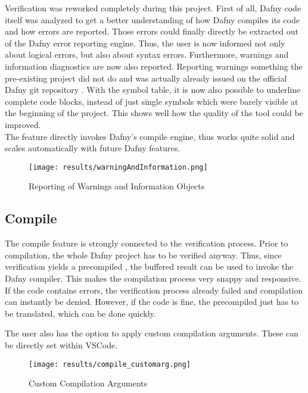 Verification was reworked completely during this project.
First of all, Dafny code itself was analyzed to get a better understanding of how Dafny compiles its code and how errors are reported.
Those errors could finally directly be extracted out of the Dafny error reporting engine.
Thus, the user is now informed not only about logical errors, but also about syntax errors.
Furthermore, warnings and information diagnostics are now also reported.
Reporting warnings something the pre-existing project did not do and was actually already issued on the official Dafny git repository \cite{dafny_noWarnings}.
With the symbol table, it is now also possible to underline complete code blocks, instead of just single symbols which were barely visible at the beginning of the project.
This shows well how the quality of the tool could be improved.\\

The feature directly invokes Dafny's compile engine, thus works quite solid and scales automatically with future Dafny features.

\begin{figure}[H]
    \centering
    \texttt{[image: results/warningAndInformation.png]}
    \caption{Reporting of Warnings and Information Objects}
    \label{fig:result_warnd_info}
\end{figure}

\subsection{Compile}
The compile feature is strongly connected to the verification process.
Prior to compilation, the whole Dafny project has to be verified anyway.
Thus, since verification yields a precompiled , the buffered result can be used to invoke the Dafny compiler.
This makes the compilation process very snappy and responsive.\\

If the code contains errors, the verification process already failed and compilation can instantly be denied.
However, if the code is fine, the precompiled  just has to be translated, which can be done quickly.

The user also has the option to apply custom compilation arguments.
These can be directly set within VSCode.
\begin{figure}[H]
    \centering
    \texttt{[image: results/compile\_customarg.png]}
    \caption{Custom Compilation Arguments}
    \label{fig:compilation_custom_args}
\end{figure}

